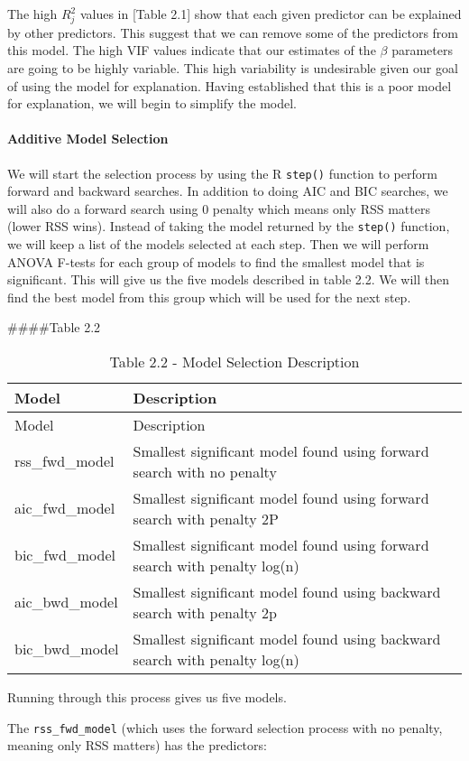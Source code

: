 \documentclass[
]{article}
\begin{document}
The high \(R^2_j\) values in {[}Table 2.1{]} show that each given
predictor can be explained by other predictors. This suggest that we can
remove some of the predictors from this model. The high VIF values
indicate that our estimates of the \(\beta\) parameters are going to be
highly variable. This high variability is undesirable given our goal of
using the model for explanation. Having established that this is a poor
model for explanation, we will begin to simplify the model.

\hypertarget{additive-model-selection}{%
\paragraph{Additive Model Selection}\label{additive-model-selection}}

We will start the selection process by using the R \texttt{step()}
function to perform forward and backward searches. In addition to doing
AIC and BIC searches, we will also do a forward search using 0 penalty
which means only RSS matters (lower RSS wins). Instead of taking the
model returned by the \texttt{step()} function, we will keep a list of
the models selected at each step. Then we will perform ANOVA F-tests for
each group of models to find the smallest model that is significant.
This will give us the five models described in table 2.2. We will then
find the best model from this group which will be used for the next
step.

\#\#\#\#Table 2.2

\begin{longtable}[]{@{}ll@{}}
\caption{Table 2.2 - Model Selection Description}\tabularnewline
\toprule
Model & Description\tabularnewline
\midrule
\endfirsthead
\toprule
Model & Description\tabularnewline
\midrule
\endhead
rss\_fwd\_model & Smallest significant model found using forward search
with no penalty\tabularnewline
aic\_fwd\_model & Smallest significant model found using forward search
with penalty 2P\tabularnewline
bic\_fwd\_model & Smallest significant model found using forward search
with penalty log(n)\tabularnewline
aic\_bwd\_model & Smallest significant model found using backward search
with penalty 2p\tabularnewline
bic\_bwd\_model & Smallest significant model found using backward search
with penalty log(n)\tabularnewline
\bottomrule
\end{longtable}

Running through this process gives us five models.

The \texttt{rss\_fwd\_model} (which uses the forward selection process
with no penalty, meaning only RSS matters) has the predictors:
\end{document}
